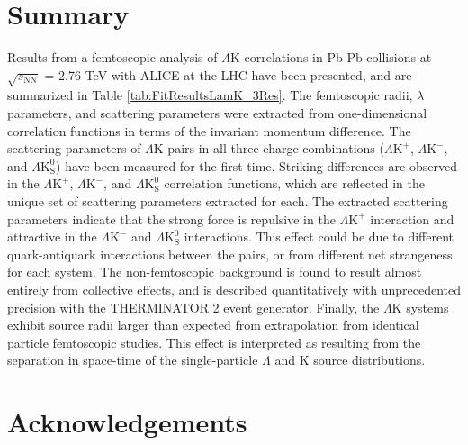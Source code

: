 \documentclass[ALICE,manyauthors]{cernphprep}
\newcommand{\ResultsDirBaseLamKch}{/home/jesse/Analysis/FemtoAnalysis/Results/Results_cLamcKch_20190319/}
\newcommand{\MomRes}{_MomResCrctn}%
\newcommand{\NonFlatBgdLamKch}{_NonFlatBgdCrctnLamK0LamKchPolynomial}
\newcommand{\ResNum}{_3Res}
\newcommand{\PrimMaxDecay}{_PrimMaxDecay10fm}
\newcommand{\ResMethod}{_UsingXiDataAndCoulombOnly}
\newcommand{\ParamFixAndShareLamKch}{_ShareLam_Dualie_ShareLam_ShareRadii}
\newcommand{\SaveNameModLamKch}{\MomRes\NonFlatBgdLamKch\ResNum\PrimMaxDecay\ResMethod\ParamFixAndShareLamKch}
\newcommand{\Lam}{$\Lambda$\xspace}
\newcommand{\LamK}{$\Lambda$K\xspace}
\newcommand{\LamKchP}{$\Lambda\mathrm{K^{+}}$\xspace}
\newcommand{\LamKchM}{$\Lambda\mathrm{K^{-}}$\xspace}
\newcommand{\LamKs}{$\Lambda\mathrm{K^{0}_{S}}$\xspace}
\begin{document}
\section{Summary}
\label{sec:Summary}



Results from a femtoscopic analysis of \LamK correlations in Pb-Pb collisions at $\sqrt{s_{\mathrm{NN}}}$ = 2.76 TeV with ALICE at the LHC have been presented, and are summarized in Table \ref{tab:FitResultsLamK_3Res}.
The femtoscopic radii, $\lambda$ parameters, and scattering parameters were extracted from one-dimensional correlation functions in terms of the invariant momentum difference.
The scattering parameters of \LamK pairs in all three charge combinations (\LamKchP, \LamKchM, and \LamKs) have been measured for the first time.
Striking differences are observed in the \LamKchP, \LamKchM, and \LamKs correlation functions, which are reflected in the unique set of scattering parameters extracted for each.
The extracted scattering parameters indicate that the strong force is repulsive in the \LamKchP interaction and attractive in the \LamKchM and \LamKs interactions.
This effect could be due to different quark-antiquark interactions between the pairs, or from different net strangeness for each system. 
The non-femtoscopic background is found to result almost entirely from collective effects, and is described quantitatively with unprecedented precision with the THERMINATOR 2 event generator.
Finally, the \LamK systems exhibit source radii larger than expected from extrapolation from identical particle femtoscopic studies.
This effect is interpreted as resulting from the separation in space-time of the single-particle \Lam and K source distributions.

\newenvironment{acknowledgement}{\relax}{\relax}
\begin{acknowledgement}
\section*{Acknowledgements}
\end{acknowledgement}


\end{document}
